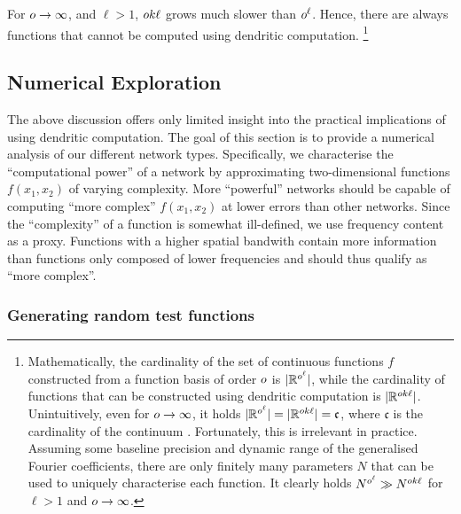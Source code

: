 For $o \to \infty$, and $\ell > 1$, $o k \ell$ grows much slower than $o^\ell$.
Hence, there are always functions that cannot be computed using dendritic computation.%
\footnote{Mathematically, the cardinality of the set of continuous functions $f$ constructed from a function basis of order $o$ is $|\mathbb{R}^{o^\ell}|$, while the cardinality of functions that can be constructed using dendritic computation is $|\mathbb{R}^{o k \ell}|$.
Unintuitively, even for $o \to \infty$, it holds $|\mathbb{R}^{o^\ell}| = |\mathbb{R}^{o k\ell}| = \mathfrak{c}$, where $\mathfrak{c}$ is the cardinality of the continuum \citep[e.g.,][Chapter~4]{jech2003set}.
Fortunately, this is irrelevant in practice.
Assuming some baseline precision and dynamic range of the generalised Fourier coefficients, there are only finitely many parameters $N$ that can be used to uniquely characterise each function. It clearly holds $N^{o^\ell} \gg N^{o k \ell}$ for $\ell > 1$ and $o \to \infty$.}

\subsection{Numerical Exploration}
\label{sec:dendritic_computation_theory_numerical}

The above discussion offers only limited insight into the practical implications of using dendritic computation.
The goal of this section is to provide a numerical analysis of our different network types.
Specifically, we characterise the \enquote{computational power} of a network by approximating two-dimensional functions $f(x_1, x_2)$ of varying complexity.
More \enquote{powerful} networks should be capable of computing \enquote{more complex} $f(x_1, x_2)$ at lower errors than other networks.
Since the \enquote{complexity} of a function is somewhat ill-defined, we use frequency content as a proxy.
Functions with a higher spatial bandwith contain more information \citep[cf.][]{shannon1949communication} than functions only composed of lower frequencies and should thus qualify as \enquote{more complex}.

\subsubsection{Generating random test functions}

